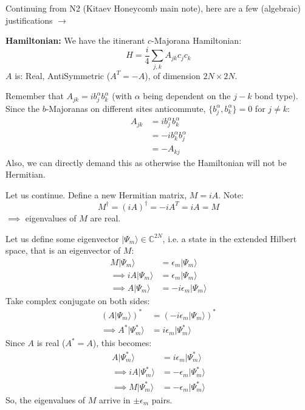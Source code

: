 \documentclass[11pt,a4paper]{article}
\begin{document}
Continuing from N2 (Kitaev Honeycomb main note), here are a few (algebraic) justifications $\rightarrow$

\vspace{0.5cm}
\noindent\textbf{Hamiltonian:}
We have the itinerant $c$-Majorana Hamiltonian:
\begin{equation*}
H = \frac{i}{4} \sum_{j,k} A_{jk} c_j c_k
\end{equation*}
$A$ is: Real, AntiSymmetric ($A^T = -A$), of dimension $2N \times 2N$.

\begin{sidenote}
Remember that $A_{jk} = i b_j^\alpha b_k^\alpha$ (with $\alpha$ being dependent on the $j-k$ bond type). Since the $b$-Majoranas on different sites anticommute, $\{b_j^\alpha, b_k^\alpha\} = 0$ for $j \neq k$:
\begin{align*}
A_{jk} &= i b_j^\alpha b_k^\alpha \\
&= -i b_k^\alpha b_j^\alpha \\
&= -A_{kj}
\end{align*}
Also, we can directly demand this as otherwise the Hamiltonian will not be Hermitian.
\end{sidenote}

\noindent Let us continue. Define a new Hermitian matrix, $M = iA$.
Note:
\begin{equation*}
M^\dagger = (iA)^\dagger = -iA^T = iA = M 
\end{equation*}
$\implies$ eigenvalues of $M$ are real.

Let us define some eigenvector $|\Psi_m\rangle \in \mathbb{C}^{2N}$, i.e. a state in the extended Hilbert space, that is an eigenvector of $M$:
\begin{align*}
M|\Psi_m\rangle &= \epsilon_m|\Psi_m\rangle \\
\implies iA|\Psi_m\rangle &= \epsilon_m|\Psi_m\rangle \\
\implies A|\Psi_m\rangle &= -i\epsilon_m|\Psi_m\rangle
\end{align*}
Take complex conjugate on both sides:
\begin{align*}
(A|\Psi_m\rangle)^* &= (-i\epsilon_m|\Psi_m\rangle)^* \\
\implies A^*|\Psi_m^*\rangle &= i\epsilon_m|\Psi_m^*\rangle
\end{align*}
Since $A$ is real ($A^* = A$), this becomes:
\begin{align*}
A|\Psi_m^*\rangle &= i\epsilon_m|\Psi_m^*\rangle \\
\implies iA|\Psi_m^*\rangle &= -\epsilon_m|\Psi_m^*\rangle \\
\implies M|\Psi_m^*\rangle &= -\epsilon_m|\Psi_m^*\rangle
\end{align*}
So, the eigenvalues of $M$ arrive in $\pm \epsilon_m$ pairs.
\end{document}
